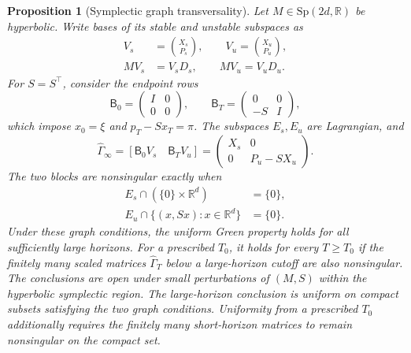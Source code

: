 \documentclass[twocolumn,nameyear,amsthm]{autart}
\newcommand{\R}{\mathbb R}
\newcommand{\Bzero}{\mathsf B_0}
\newcommand{\BT}{\mathsf B_T}
\numberwithin{equation}{section}
\newtheorem{proposition}[theorem]{Proposition}
\begin{document}
\begin{proposition}[Symplectic graph transversality]
\label{prop:symplectic-graph}
Let $M\in\mathrm{Sp}(2d,\R)$ be hyperbolic.  Write bases of its stable and
unstable subspaces as
\[
 \begin{aligned}
 V_s&=\binom{X_s}{P_s},\qquad V_u=\binom{X_u}{P_u},\\
 MV_s&=V_sD_s,\qquad MV_u=V_uD_u.
 \end{aligned}
\]
For $S=S^\top$, consider the endpoint rows
\begin{equation}\label{eq:graph-endpoint-rows}
 \Bzero=\begin{pmatrix}I&0\\0&0\end{pmatrix},\qquad
 \BT=\begin{pmatrix}0&0\\-S&I\end{pmatrix},
\end{equation}
which impose $x_0=\xi$ and $p_T-Sx_T=\pi$.  The subspaces $E_s,E_u$ are
Lagrangian, and
\begin{equation}\label{eq:lq-limit-matrix}
 \widehat\Gamma_\infty=[\Bzero V_s\quad\BT V_u]
 =\begin{pmatrix}X_s&0\\0&P_u-SX_u\end{pmatrix}.
\end{equation}
The two blocks are nonsingular exactly when
\begin{equation}\label{eq:graph-intersections}
 \begin{aligned}
 E_s\cap(\{0\}\times\R^d)&=\{0\},\\
 E_u\cap\{(x,Sx):x\in\R^d\}&=\{0\}.
 \end{aligned}
\end{equation}
Under these graph conditions, the uniform Green property holds for all
sufficiently large horizons.  For a prescribed $T_0$, it holds for every
$T\ge T_0$ if the finitely many scaled matrices $\widehat\Gamma_T$ below a
large-horizon cutoff are also nonsingular.  The conclusions are open under
small perturbations of $(M,S)$ within the hyperbolic symplectic region.  The
large-horizon conclusion is uniform on compact subsets satisfying the two
graph conditions.  Uniformity from a prescribed $T_0$ additionally requires
the finitely many short-horizon matrices to remain nonsingular on the compact
set.
\end{proposition}
\end{document}
